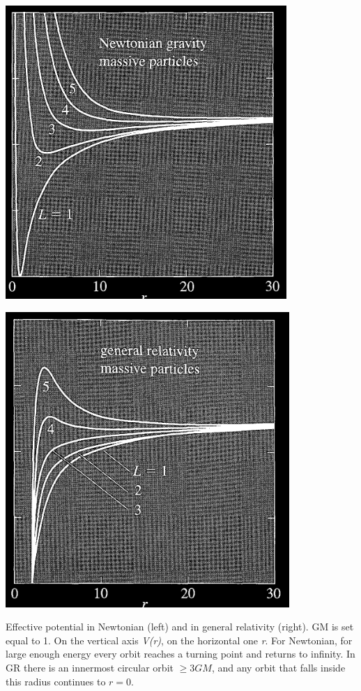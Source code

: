 \bigskip
\begin{minipage}{0.5\textwidth}
	\includegraphics[width=0.8\linewidth]{imm/newtmassive.png}
	\label{fig:sub1}
\end{minipage}
\hfill
\begin{minipage}{0.5\textwidth}\label{fig:vrvsr}
	 \includegraphics[width=0.8\linewidth]{imm/grmassive.png} 
	\label{fig:sub2}
 \end{minipage}
 \vspace{0.5cm}

Effective potential in Newtonian (left) and in general relativity (right). GM is set equal to 1. On the vertical axis \emph{V(r)}, on the horizontal one \emph{r}. For Newtonian, for large enough energy every orbit reaches a turning point and returns to infinity. In GR there is an innermost circular orbit $\geq 3GM$, and any orbit that falls inside this radius continues to $r=0$.\par
 
